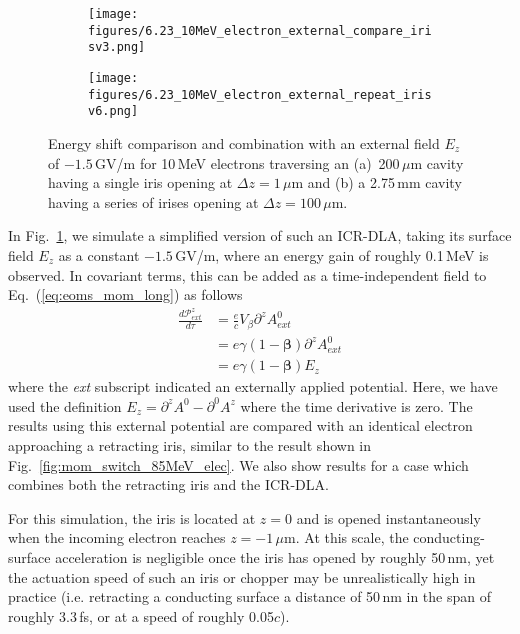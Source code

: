 \documentclass[reprint,
               amsmath,amssymb,nofootinbib, aps%
              ]{revtex4-2}
\begin{document}
\begin{figure}
  \begin{subfigure}{\columnwidth}
    \centering
    \texttt{[image: figures/6.23\_10MeV\_electron\_external\_compare\_irisv3.png]}
    \caption{}
    \label{fig:external_DLA_vs_iris_single}
  \end{subfigure}
  
  \begin{subfigure}{\columnwidth}
    \centering
    \texttt{[image: figures/6.23\_10MeV\_electron\_external\_repeat\_irisv6.png]}
    \caption{}
    \label{fig:external_DLA_vs_iris_repeat}
  \end{subfigure}
  \vspace{-1\baselineskip}
  \caption{Energy shift comparison and combination with an external field $E_z$ of $-1.5$\,GV/m for 10\,MeV electrons traversing an (a)~200\,{${\mu}$}m cavity having a single iris opening at $\Delta z = 1\,\mu$m and (b) a 2.75\,mm cavity having a series of irises opening at $\Delta z = 100\,\mu$m.}
  \label{fig:external_DLA_vs_iris}
\end{figure}

In Fig.~\ref{fig:external_DLA_vs_iris_single}, we simulate a simplified version of such an ICR-DLA, taking its surface field $E_z$ as a constant $-1.5$\,GV/m, where an energy gain of roughly 0.1\,MeV is observed. In covariant terms, this can be added as a time-independent field to Eq.~(\ref{eq:eoms_mom_long}) as follows
\begin{align}
    \frac{d \mathcal{P}^z_{ext}}{d \tau} &= \frac{e}{c}V_{\beta}\partial^z A^0_{ext}
    \nonumber \\
    &=  e\gamma\left(1-\boldsymbol{\beta}\right)\partial^z A^0_{ext}
    \nonumber \\
    &=  e\gamma\left(1-\boldsymbol{\beta}\right)E_z
\end{align}
\noindent where the \textit{ext} subscript indicated an externally applied potential. Here, we have used the definition $E_z = \partial^z A^0 - \partial^0 A^z$ where the time derivative is zero. The results using this external potential are compared with an identical electron approaching a retracting iris, similar to the result shown in Fig.~\ref{fig:mom_switch_85MeV_elec}. We also show results for a case which combines both the retracting iris and the ICR-DLA.

For this simulation, the iris is located at $z=0$ and is opened instantaneously when the incoming electron reaches $z=-1$\,${\mu}$m. At this scale, the conducting-surface acceleration is negligible once the iris has opened by roughly 50\,nm, yet the actuation speed of such an iris or chopper may be unrealistically high in practice (i.e. retracting a conducting surface a distance of 50\,nm in the span of roughly 3.3\,fs, or at a speed of roughly 0.05$c$).
\end{document}
